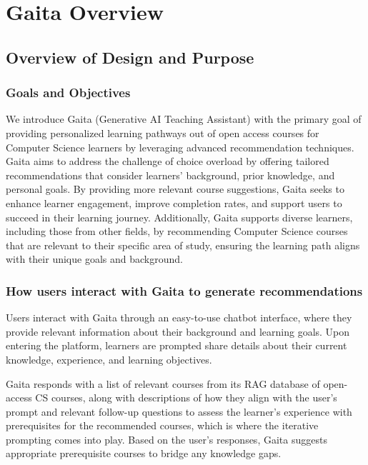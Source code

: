 \chapter{Gaita Overview} \label{chap:chap-3}





\section{Overview of Design and Purpose}

\subsection{Goals and Objectives}
We introduce Gaita (Generative AI Teaching Assistant) with the primary goal of providing personalized learning pathways out of open access courses for Computer Science learners by leveraging advanced recommendation techniques. Gaita aims to address the challenge of choice overload by offering tailored recommendations that consider learners' background, prior knowledge, and personal goals. By providing more relevant course suggestions, Gaita seeks to enhance learner engagement, improve completion rates, and support users to succeed in their learning journey. Additionally, Gaita supports diverse learners, including those from other fields, by recommending Computer Science courses that are relevant to their specific area of study, ensuring the learning path aligns with their unique goals and background.

\subsection{How users interact with Gaita to generate recommendations}

Users interact with Gaita through an easy-to-use chatbot interface, where they provide relevant information about their background and learning goals. Upon entering the platform, learners are prompted share details about their current knowledge, experience, and learning objectives. 

Gaita responds with a list of relevant courses from its RAG database of open-access CS courses, along with descriptions of how they align with the user’s prompt and relevant follow-up questions to assess the learner's experience with prerequisites for the recommended courses, which is where the iterative prompting comes into play. Based on the user's responses, Gaita suggests appropriate prerequisite courses to bridge any knowledge gaps. 

